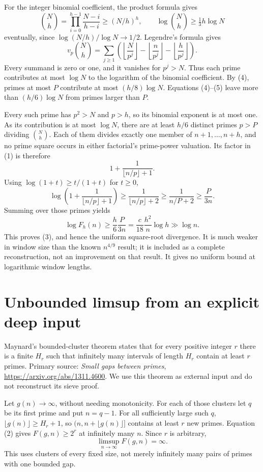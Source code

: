 \documentclass[11pt]{article}
\begin{document}
For the integer binomial coefficient, the product formula gives
\[
 \binom Nh=\prod_{i=0}^{h-1}\frac{N-i}{h-i}\ge(N/h)^h,
 \qquad\log\binom Nh\ge\tfrac13 h\log N \tag{5}
\]
eventually, since $\log(N/h)/\log N\to1/2$. Legendre's formula gives
\[
 v_p\binom Nh
 =\sum_{j\ge1}\left(\left\lfloor\frac N{p^j}\right\rfloor
 -\left\lfloor\frac n{p^j}\right\rfloor
 -\left\lfloor\frac h{p^j}\right\rfloor\right).
\]
Every summand is zero or one, and it vanishes for $p^j>N$. Thus each prime contributes at most $\log N$ to the logarithm of the binomial coefficient. By (4), primes at most $P$ contribute at most $(h/8)\log N$. Equations (4)--(5) leave more than $(h/6)\log N$ from primes larger than $P$.

Every such prime has $p^2>N$ and $p>h$, so its binomial exponent is at most one. As its contribution is at most $\log N$, there are at least $h/6$ distinct primes $p>P$ dividing $\binom Nh$. Each of them divides exactly one member of $n+1,\ldots,n+h$, and no prime square occurs in either factorial's prime-power valuation. Its factor in (1) is therefore
\[
 1+\frac1{\lfloor n/p\rfloor+1}.
\]
Using $\log(1+t)\ge t/(1+t)$ for $t\ge0$,
\[
 \log\left(1+\frac1{\lfloor n/p\rfloor+1}\right)
 \ge\frac1{\lfloor n/p\rfloor+2}
 \ge\frac1{n/P+2}\ge\frac P{3n}.
\]
Summing over those primes yields
\[
 \log F_h(n)\ge\frac h6\frac P{3n}
 =\frac c{18}\frac{h^2}{n}\log h\gg\log n.
\]
This proves (3), and hence the uniform square-root divergence. It is much weaker in window size than the known $n^{4/9}$ result; it is included as a complete reconstruction, not an improvement on that result. It gives no uniform bound at logarithmic window lengths.

\section*{Unbounded limsup from an explicit deep input}
Maynard's bounded-cluster theorem states that for every positive integer $r$ there is a finite $H_r$ such that infinitely many intervals of length $H_r$ contain at least $r$ primes. Primary source: \emph{Small gaps between primes}, \url{https://arxiv.org/abs/1311.4600}. We use this theorem as external input and do not reconstruct its sieve proof.

Let $g(n)\to\infty$, without needing monotonicity. For each of those clusters let $q$ be its first prime and put $n=q-1$. For all sufficiently large such $q$, $\lfloor g(n)\rfloor\ge H_r+1$, so $(n,n+\lfloor g(n)\rfloor]$ contains at least $r$ new primes. Equation (2) gives $F(g,n)\ge2^r$ at infinitely many $n$. Since $r$ is arbitrary,
\[
 \limsup_{n\to\infty}F(g,n)=\infty. \tag{6}
\]
This uses clusters of every fixed size, not merely infinitely many pairs of primes with one bounded gap.
\end{document}
